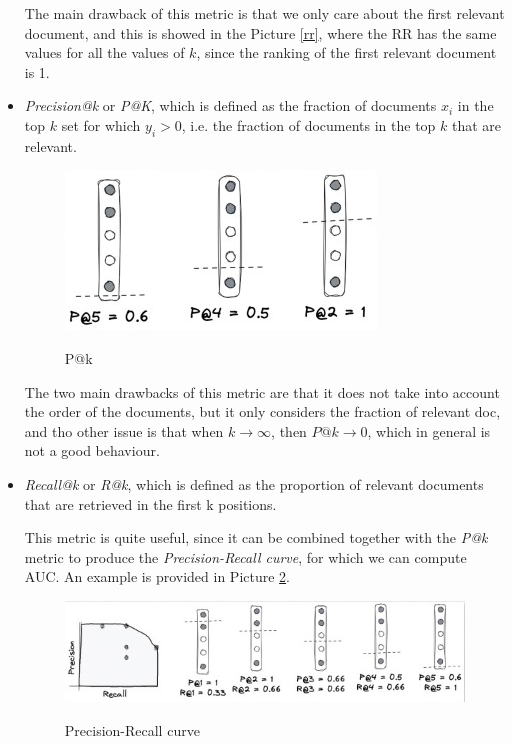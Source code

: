 \begin{itemize}
    The main drawback of this metric is that we only care about the first relevant document, and this is showed in the Picture \ref{rr}, where the RR has the same values for all the values of $k$, since the ranking of the first relevant document is 1.

    \item \textit{Precision@k} or \textit{P@K}, which is defined as the fraction of documents $x_i$ in the top $k$ set for which $y_i > 0$, i.e. the fraction of documents in the top $k$ that are relevant.

    \begin{figure}[h!]
		\centering
		\includegraphics[scale = 2.0]{img/p@k.jpg}
        \label{prec}
        \caption{P@k}
    \end{figure}

    The two main drawbacks of this metric are that it does not take into account the order of the documents, but it only considers the fraction of relevant doc, and tho other issue is that when $k \to \infty$, then $P@k \to 0$, which in general is not a good behaviour.

    \item \textit{Recall@k} or \textit{R@k}, which is defined as the proportion of relevant documents that are retrieved in the first k positions. 
    
    This metric is quite useful, since it can be combined together with the \textit{P@k} metric to produce the \textit{Precision-Recall curve}, for which we can compute AUC. An example is provided in Picture \ref{auc}.

    \begin{figure}[h!]
		\centering
		\includegraphics[scale = 2.0]{img/AUC.jpg}
        \label{auc}
        \caption{Precision-Recall curve}
    \end{figure}


\end{itemize}
